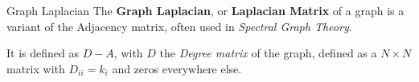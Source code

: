 \documentclass[a4paper,11pt]{book}
\begin{document}
\begin{textbox}{Graph Laplacian}
The \textbf{Graph Laplacian}, or \textbf{Laplacian Matrix} of a graph is a variant of the Adjacency matrix, often used in \textit{Spectral Graph Theory}.

It is defined as $D-A$, with $D$ the \textit{Degree matrix} of the graph, defined as a $N \times N$ matrix with $D_{ii}=k_i$ and zeros everywhere else.
\end{textbox}
\end{document}
